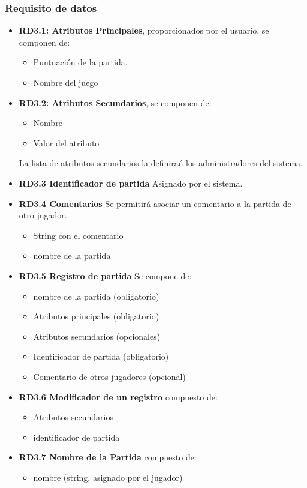 \subsubsection{Requisito de datos}

\begin{itemize}
	\item \textbf{RD3.1: Atributos Principales}, proporcionados por el usuario, se componen de:
	\begin{itemize}
		\item Puntuación de la partida.
		\item Nombre del juego
	\end{itemize}

	\item \textbf{RD3.2: Atributos Secundarios}, se componen de:
	\begin{itemize}
		\item Nombre
		\item Valor del atributo
	\end{itemize}
	La lista de atributos secundarios la definirań los administradores del sistema.

	\item \textbf{RD3.3 Identificador de partida} Asignado por el sistema.

	\item \textbf{RD3.4 Comentarios } Se permitirá asociar un comentario a la partida de otro jugador.
	\begin{itemize}
	\item String con el comentario
	\item	nombre de la partida
	\end{itemize}

	\item \textbf{RD3.5 Registro de partida} Se compone de:
	\begin{itemize}
		\item nombre de la partida	(obligatorio)
		\item Atributos principales (obligatorio)
		\item Atributos secundarios (opcionales)
		\item Identificador de partida (obligatorio)
		\item Comentario de otros jugadores (opcional)
	\end{itemize}

	\item \textbf{RD3.6 Modificador de un registro} compuesto de:
	\begin{itemize}
	\item Atributos secundarios
	\item identificador de partida
	\end{itemize}

\item \textbf{RD3.7 Nombre de la Partida}	compuesto de:
\begin{itemize}
	\item	nombre (string, asignado por el jugador)
\end{itemize}

\end{itemize}



